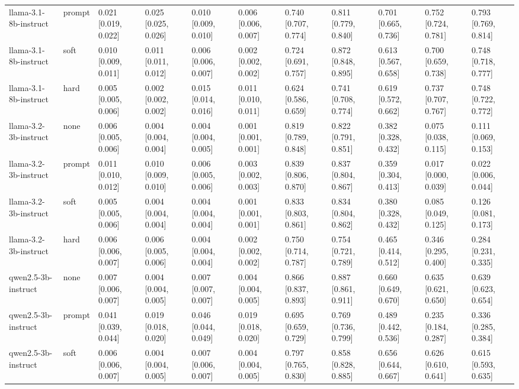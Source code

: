\begin{tabular}{lllllllllll}
llama-3.1-8b-instruct & prompt & 0.021 [0.019, 0.022] & 0.025 [0.025, 0.026] & 0.010 [0.009, 0.010] & 0.006 [0.006, 0.007] & 0.740 [0.707, 0.774] & 0.811 [0.779, 0.840] & 0.701 [0.665, 0.736] & 0.752 [0.724, 0.781] & 0.793 [0.769, 0.814] \\
llama-3.1-8b-instruct & soft & 0.010 [0.009, 0.011] & 0.011 [0.011, 0.012] & 0.006 [0.006, 0.007] & 0.002 [0.002, 0.002] & 0.724 [0.691, 0.757] & 0.872 [0.848, 0.895] & 0.613 [0.567, 0.658] & 0.700 [0.659, 0.738] & 0.748 [0.718, 0.777] \\
llama-3.1-8b-instruct & hard & 0.005 [0.005, 0.006] & 0.002 [0.002, 0.002] & 0.015 [0.014, 0.016] & 0.011 [0.010, 0.011] & 0.624 [0.586, 0.659] & 0.741 [0.708, 0.774] & 0.619 [0.572, 0.662] & 0.737 [0.707, 0.767] & 0.748 [0.722, 0.772] \\
llama-3.2-3b-instruct & none & 0.006 [0.005, 0.006] & 0.004 [0.004, 0.004] & 0.004 [0.004, 0.005] & 0.001 [0.001, 0.001] & 0.819 [0.789, 0.848] & 0.822 [0.791, 0.851] & 0.382 [0.328, 0.432] & 0.075 [0.038, 0.115] & 0.111 [0.069, 0.153] \\
llama-3.2-3b-instruct & prompt & 0.011 [0.010, 0.012] & 0.010 [0.009, 0.010] & 0.006 [0.005, 0.006] & 0.003 [0.002, 0.003] & 0.839 [0.806, 0.870] & 0.837 [0.804, 0.867] & 0.359 [0.304, 0.413] & 0.017 [0.000, 0.039] & 0.022 [0.006, 0.044] \\
llama-3.2-3b-instruct & soft & 0.005 [0.005, 0.006] & 0.004 [0.004, 0.004] & 0.004 [0.004, 0.004] & 0.001 [0.001, 0.001] & 0.833 [0.803, 0.861] & 0.834 [0.804, 0.862] & 0.380 [0.328, 0.432] & 0.085 [0.049, 0.125] & 0.126 [0.081, 0.173] \\
llama-3.2-3b-instruct & hard & 0.006 [0.006, 0.007] & 0.006 [0.005, 0.006] & 0.004 [0.004, 0.004] & 0.002 [0.002, 0.002] & 0.750 [0.714, 0.787] & 0.754 [0.721, 0.789] & 0.465 [0.414, 0.512] & 0.346 [0.295, 0.400] & 0.284 [0.231, 0.335] \\
qwen2.5-3b-instruct & none & 0.007 [0.006, 0.007] & 0.004 [0.004, 0.005] & 0.007 [0.007, 0.007] & 0.004 [0.004, 0.005] & 0.866 [0.837, 0.893] & 0.887 [0.861, 0.911] & 0.660 [0.649, 0.670] & 0.635 [0.621, 0.650] & 0.639 [0.623, 0.654] \\
qwen2.5-3b-instruct & prompt & 0.041 [0.039, 0.044] & 0.019 [0.018, 0.020] & 0.046 [0.044, 0.049] & 0.019 [0.018, 0.020] & 0.695 [0.659, 0.729] & 0.769 [0.736, 0.799] & 0.489 [0.442, 0.536] & 0.235 [0.184, 0.287] & 0.336 [0.285, 0.384] \\
qwen2.5-3b-instruct & soft & 0.006 [0.006, 0.007] & 0.004 [0.004, 0.005] & 0.007 [0.006, 0.007] & 0.004 [0.004, 0.005] & 0.797 [0.765, 0.830] & 0.858 [0.828, 0.885] & 0.656 [0.644, 0.667] & 0.626 [0.610, 0.641] & 0.615 [0.593, 0.635] \\

\end{tabular}
